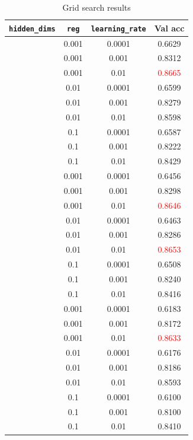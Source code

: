 \documentclass[10pt,a4paper,twoside]{tau}
\begin{document}
\begin{table}[h]
    \centering
    \begin{tabular}{|c|c|c|c|}
        \hline
        \texttt{hidden\_dims} & \texttt{reg} & \texttt{learning\_rate} & Val acc\\ \hline
        [128, 64] & 0.001 & 0.0001 & 0.6629 \\ \hline
        [128, 64] & 0.001 & 0.001  & 0.8312 \\ \hline
        [128, 64] & 0.001 & 0.01   & \textcolor{red}{0.8665} \\ \hline
        [128, 64] & 0.01  & 0.0001 & 0.6599 \\ \hline
        [128, 64] & 0.01  & 0.001  & 0.8279 \\ \hline
        [128, 64] & 0.01  & 0.01   & 0.8598 \\ \hline
        [128, 64] & 0.1   & 0.0001 & 0.6587 \\ \hline
        [128, 64] & 0.1   & 0.001  & 0.8222 \\ \hline
        [128, 64] & 0.1   & 0.01   & 0.8429 \\ \hline
        [128, 48] & 0.001 & 0.0001 & 0.6456 \\ \hline
        [128, 48] & 0.001 & 0.001  & 0.8298 \\ \hline
        [128, 48] & 0.001 & 0.01   & \textcolor{red}{0.8646} \\ \hline
        [128, 48] & 0.01  & 0.0001 & 0.6463 \\ \hline
        [128, 48] & 0.01  & 0.001  & 0.8286 \\ \hline
        [128, 48] & 0.01  & 0.01   & \textcolor{red}{0.8653} \\ \hline
        [128, 48] & 0.1   & 0.0001 & 0.6508 \\ \hline
        [128, 48] & 0.1   & 0.001  & 0.8240 \\ \hline
        [128, 48] & 0.1   & 0.01   & 0.8416 \\ \hline
        [64, 48] & 0.001 & 0.0001 & 0.6183 \\ \hline
        [64, 48] & 0.001 & 0.001  & 0.8172 \\ \hline
        [64, 48] & 0.001 & 0.01   & \textcolor{red}{0.8633} \\ \hline
        [64, 48] & 0.01  & 0.0001 & 0.6176 \\ \hline
        [64, 48] & 0.01  & 0.001  & 0.8186 \\ \hline
        [64, 48] & 0.01  & 0.01   & 0.8593 \\ \hline
        [64, 48] & 0.1   & 0.0001 & 0.6100 \\ \hline
        [64, 48] & 0.1   & 0.001  & 0.8100 \\ \hline
        [64, 48] & 0.1   & 0.01   & 0.8410 \\ \hline
    \end{tabular}
    \caption{Grid search results}
    \label{tab:grid-search-results}
\end{table}
\end{document}
